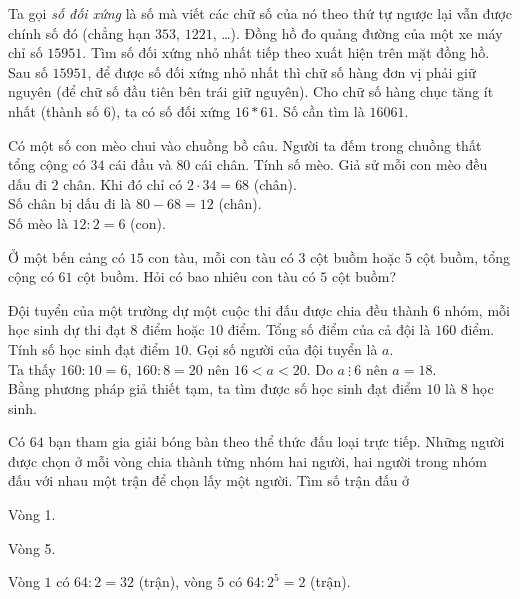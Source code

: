 \begin{bt}
	Ta gọi \emph{số đối xứng} là số mà viết các chữ số của nó theo thứ tự ngược lại vẫn được chính số đó (chẳng hạn $353$, $1221$, \ldots). Đồng hồ đo quảng đường của một xe máy chỉ số $15951$. Tìm số đối xứng nhỏ nhất tiếp theo xuất hiện trên mặt đồng hồ.
	\loigiai
	{
		Sau số $15951$, để được số đối xứng nhỏ nhất thì chữ số hàng đơn vị phải giữ nguyên (để chữ số đầu tiên bên trái giữ nguyên). Cho chữ số hàng chục tăng ít nhất (thành số $6$), ta có số đối xứng $16*61$. Số cần tìm là $16061$.
	}
\end{bt}

\begin{bt}
	Có một số con mèo chui vào chuồng bồ câu. Người ta đếm trong chuồng thất tổng cộng có $34$ cái đầu và $80$ cái chân. Tính số mèo.
	\loigiai
	{
		Giả sử mỗi con mèo đều dấu đi $2$ chân. Khi đó chỉ có $2 \cdot 34 = 68$ (chân).\\
		Số chân bị dấu đi là $80-68=12$ (chân).\\
		Số mèo là $12:2=6$ (con).
	}
\end{bt}

\begin{bt}
	Ở một bến cảng có $15$ con tàu, mỗi con tàu có $3$ cột buồm hoặc $5$ cột buồm, tổng cộng có $61$ cột buồm. Hỏi có bao nhiêu con tàu có $5$ cột buồm?
\end{bt}

\begin{bt}
	Đội tuyển của một trường dự một cuộc thi đấu được chia đều thành $6$ nhóm, mỗi học sinh dự thi đạt $8$ điểm hoặc $10$ điểm. Tổng số điểm của cả đội là $160$ điểm. Tính số học sinh đạt điểm $10$.
	\loigiai
	{
		Gọi số người của đội tuyển là $a$.\\
		Ta thấy $160:10=6$, $160:8=20$ nên $16<a<20$. Do $a \ \vdots \ 6$ nên $a = 18$.\\
		Bằng phương pháp giả thiết tạm, ta tìm được số học sinh đạt điểm $10$ là $8$ học sinh.
	}
\end{bt}

\begin{bt}
	Có $64$ bạn tham gia giải bóng bàn theo thể thức đấu loại trực tiếp. Những người được chọn ở mỗi vòng chia thành từng nhóm hai người, hai người trong nhóm đấu với nhau một trận để chọn lấy một người. Tìm số trận đấu ở
	\begin{listEX}[2]
		\item Vòng 1.
		\item Vòng 5.
	\end{listEX}
	\dapso
	{
		Vòng $1$ có $64:2 = 32$ (trận), vòng $5$ có $64:2^5 = 2$ (trận).
	}
\end{bt}

